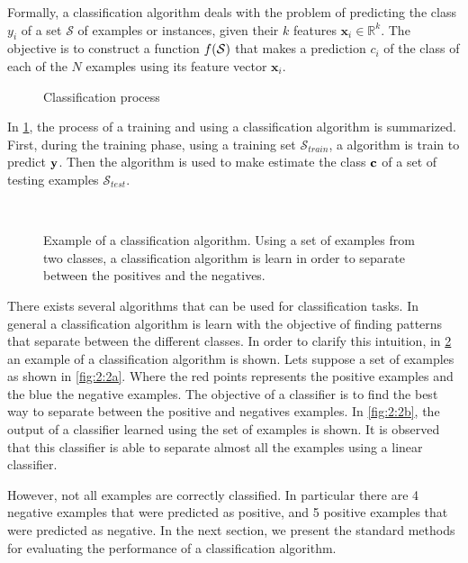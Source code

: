 Formally, a classification algorithm deals with the problem	of predicting the class $y_i$ of a 
set $\mathcal{S}$ of examples or instances, given their $k$ features \mbox{$\mathbf{x}_i \in 
\mathbb{R}^k$}. The objective is to construct a function $f(\cal{S})$ that makes a prediction 
$c_i$ of the class of each of the $N$ examples using its feature vector $\mathbf{x}_i$.
\label{ntn:ch2:1}

\begin{figure}
	\centering
	
  \caption{Classification process}
  \label{fig:2:1}
\end{figure}

In \figurename{ \ref{fig:2:1}}, the process of a training and using a classification algorithm is 
summarized. First, during the training phase, using a training set $\mathcal{S}_{train}$, a 
algorithm is train to predict $\bf y$. Then the algorithm is used to make estimate the class $\bf 
c$ of a set of testing examples $\mathcal{S}_{test}$.

\begin{figure}[!t]
\centering
{}
\\
\caption{Example of a classification algorithm. Using a set of examples from two classes, a 
	classification algorithm is learn in order to separate between the positives and the negatives. }
\label{fig:2:2}
\end{figure} 

There exists several algorithms that can be used for classification tasks. In general a 
classification algorithm is learn with the objective of finding patterns that separate between the 
different classes. In order to clarify this intuition, in \figurename{ \ref{fig:2:2}} an example 
of a classification algorithm is shown. Lets suppose a set of examples as shown in \figurename{ 
\ref{fig:2:2a}}.  Where the red points represents the positive examples and the blue the negative 
examples. The objective of a classifier is to find the best way to separate between the positive and 
negatives examples. In \figurename{ \ref{fig:2:2b}}, the output of a classifier learned using the 
set of examples is shown. It is observed that this classifier is able to separate almost all the 
examples using a linear classifier. 

However, not all examples are correctly classified. In particular there are 4 negative examples that 
were predicted as positive, and 5 positive examples that were predicted as negative. In the next 
section, we present the standard methods for evaluating the performance of a classification 
algorithm.

